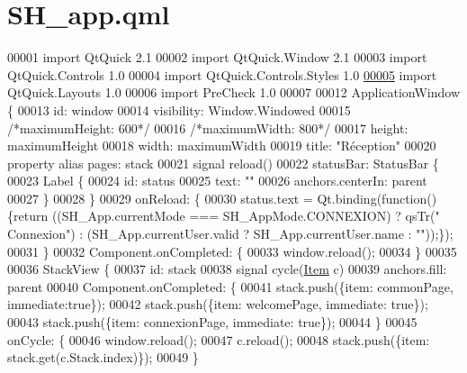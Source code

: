 \hypertarget{SH__app_8qml}{\section{S\-H\-\_\-app.\-qml}
\label{SH__app_8qml}
}

\begin{DoxyCode}
00001 \textcolor{keyword}{import} QtQuick 2.1
00002 import QtQuick.Window 2.1
00003 import QtQuick.Controls 1.0
00004 import QtQuick.Controls.Styles 1.0
\hypertarget{SH__app_8qml_source_l00005}{}\hyperlink{classSH__app}{00005} import QtQuick.Layouts 1.0
00006 import PreCheck 1.0
00007 
00012 ApplicationWindow \{
00013     \textcolor{keywordtype}{id}: window
00014     visibility: Window.Windowed
00015     \textcolor{comment}{/*maximumHeight: 600*/}
00016     \textcolor{comment}{/*maximumWidth: 800*/}
00017     height: maximumHeight
00018     width: maximumWidth
00019     title: \textcolor{stringliteral}{"Réception"}
00020     \textcolor{keyword}{property} alias pages: stack
00021     signal reload()
00022     statusBar: StatusBar \{
00023         Label \{
00024             \textcolor{keywordtype}{id}: status
00025             text: \textcolor{stringliteral}{""}
00026             anchors.centerIn: parent
00027         \}
00028     \}
00029     onReload: \{
00030         status.text = Qt.binding(\textcolor{keyword}{function}() \{\textcolor{keywordflow}{return} ((SH\_App.currentMode === SH\_AppMode.CONNEXION) ? qsTr(\textcolor{stringliteral}{"
      Connexion"}) : (SH\_App.currentUser.valid ? SH\_App.currentUser.name : \textcolor{stringliteral}{""}));\});
00031     \}
00032     Component.onCompleted: \{
00033         window.reload();
00034     \}
00035 
00036     StackView \{
00037         \textcolor{keywordtype}{id}: stack
00038         signal cycle(\hyperlink{classItem}{Item} c)
00039         anchors.fill: parent
00040         Component.onCompleted: \{
00041             stack.push(\{item: commonPage, immediate:\textcolor{keyword}{true}\});
00042             stack.push(\{item: welcomePage, immediate: \textcolor{keyword}{true}\});
00043             stack.push(\{item: connexionPage, immediate: \textcolor{keyword}{true}\});
00044         \}
00045         onCycle: \{
00046             window.reload();
00047             c.reload();
00048             stack.push(\{item: stack.get(c.Stack.index)\});
00049         \}

\end{DoxyCode}
